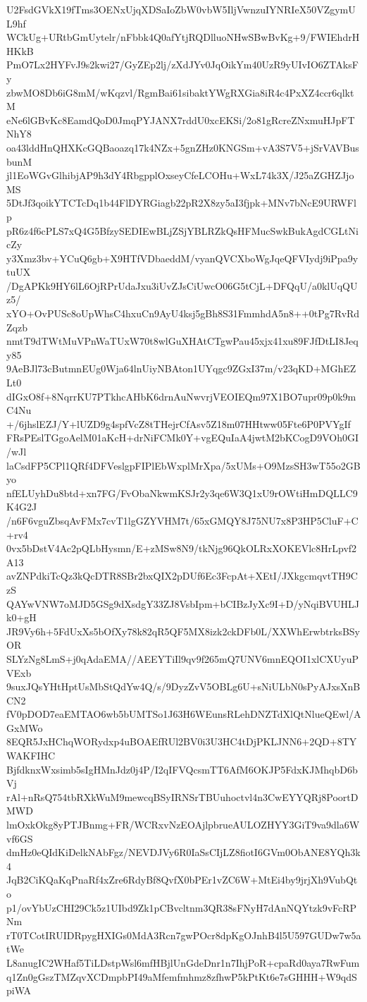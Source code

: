U2FsdGVkX19fTms3OENxUjqXDSaIoZbW0vbW5IljVwnzuIYNRIeX50VZgymUL9hf
WCkUg+URtbGmUytelr/nFbbk4Q0afYtjRQDlluoNHwSBwBvKg+9/FWIEhdrHHKkB
PmO7Lx2HYFvJ9s2kwi27/GyZEp2lj/zXdJYv0JqOikYm40UzR9yUIvIO6ZTAksFy
zbwMO8Db6iG8mM/wKqzvl/RgmBai61sibaktYWgRXGia8iR4c4PxXZ4ccr6qlktM
eNe6lGBvKc8EamdQoD0JmqPYJANX7rddU0xcEKSi/2o81gRcreZNxmuHJpFTNhY8
oa43lddHnQHXKcGQBaoazq17k4NZx+5gnZHz0KNGSm+vA3S7V5+jSrVAVBusbunM
jl1EoWGvGlhibjAP9h3dY4RbgpplOxseyCfeLCOHu+WxL74k3X/J25aZGHZJjoMS
5DtJf3qoikYTCTcDq1b44FlDYRGiagb22pR2X8zy5aI3fjpk+MNv7bNcE9URWFlp
pR6z4f6cPLS7xQ4G5BfzySEDIEwBLjZSjYBLRZkQsHFMucSwkBukAgdCGLtNicZy
y3Xmz3bv+YCuQ6gb+X9HTfVDbaeddM/vyanQVCXboWgJqeQFVIydj9iPpa9ytuUX
/DgAPKk9HY6lL6OjRPrUdaJxu3iUvZJsCiUwcO06G5tCjL+DFQqU/a0klUqQUz5/
xYO+OvPUSc8oUpWhsC4hxuCn9AyU4ksj5gBh8S31FmmhdA5n8++0tPg7RvRdZqzb
nmtT9dTWtMuVPnWaTUxW70t8wlGuXHAtCTgwPau45xjx41xu89FJfDtLI8Jeqy85
9AeBJl73cButmnEUg0Wja64lnUiyNBAton1UYqgc9ZGxI37m/v23qKD+MGhEZLt0
dIGxO8f+8NqrrKU7PTkhcAHbK6drnAuNwvrjVEOIEQm97X1BO7upr09p0k9mC4Nu
+/6jhslEZJ/Y+lUZD9g4spfVcZ8tTHejrCfAsv5Z18m07HHtww05Fte6P0PVYgIf
FRsPEslTGgoAelM01aKcH+drNiFCMk0Y+vgEQuIaA4jwtM2bKCogD9VOh0GI/wJl
laCsdFP5CPl1QRf4DFVeslgpFIPlEbWxplMrXpa/5xUMs+O9MzsSH3wT55o2GByo
nfELUyhDu8btd+xn7FG/FvObaNkwmKSJr2y3qe6W3Q1xU9rOWtiHmDQLLC9K4G2J
/n6F6vguZbsqAvFMx7cvT1lgGZYVHM7t/65xGMQY8J75NU7x8P3HP5CluF+C+rv4
0vx5bDstV4Ac2pQLbHysmn/E+zMSw8N9/tkNjg96QkOLRxXOKEVlc8HrLpvf2A13
avZNPdkiTcQz3kQcDTR8SBr2bxQIX2pDUf6Ec3FcpAt+XEtI/JXkgcmqvtTH9CzS
QAYwVNW7oMJD5GSg9dXsdgY33ZJ8VsbIpm+bCIBzJyXc9I+D/yNqiBVUHLJk0+gH
JR9Vy6h+5FdUxXs5bOfXy78k82qR5QF5MX8izk2ckDFb0L/XXWhErwbtrksBSyOR
SLYzNg8LmS+j0qAdaEMA//AEEYTiIl9qv9f265mQ7UNV6mnEQOI1xlCXUyuPVExb
9suxJQsYHtHptUsMbStQdYw4Q/s/9DyzZvV5OBLg6U+sNiULbN0sPyAJxsXnBCN2
fV0pDOD7eaEMTAO6wb5bUMTSo1J63H6WEunsRLehDNZTdXlQtNlueQEwl/AGxMWo
8EQR5JxHChqWORydxp4uBOAEfRUl2BV0i3U3HC4tDjPKLJNN6+2QD+8TYWAKFIHC
BjfdknxWxsimb5sIgHMnJdz0j4P/I2qIFVQcsmTT6AfM6OKJP5FdxKJMhqbD6bVj
rAl+nRsQ754tbRXkWuM9mewcqBSyIRNSrTBUuhoctvl4n3CwEYYQRj8PoortDMWD
lmOxkOkg8yPTJBnmg+FR/WCRxvNzEOAjlpbrueAULOZHYY3GiT9va9dla6Wvf6GS
dmHz0eQIdKiDelkNAbFgz/NEVDJVy6R0IaSsCIjLZ8fiotI6GVm0ObANE8YQh3k4
JqB2CiKQaKqPnaRf4xZre6RdyBf8QvfX0bPEr1vZC6W+MtEi4by9jrjXh9VubQto
p1/ovYbUzCHI29Ck5z1UIbd9Zk1pCBvcltnm3QR38sFNyH7dAnNQYtzk9vFcRPNm
rT0TCotIRUIDRpygHXIGs0MdA3Rcn7gwPOcr8dpKgOJnhB4l5U597GUDw7w5atWe
L8anugIC2WHaf5TiLDstpWsl6mfHBjlUnGdeDnr1n7IhjPoR+cpaRd0aya7RwFum
q1Zn0gGszTMZqvXCDmpbPI49aMfemfmhmz8zfhwP5kPtKt6e7sGHHH+W9qdSpiWA
